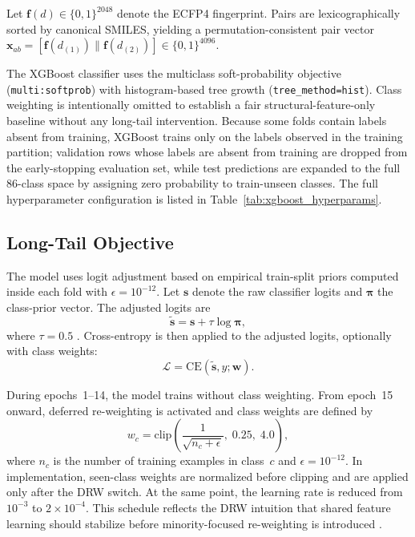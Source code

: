 \documentclass[11pt,a4paper,twocolumn]{article}
\begin{document}
Let $\mathbf{f}(d)\!\in\!\{0,1\}^{2048}$ denote the ECFP4 fingerprint.
Pairs are lexicographically sorted by canonical SMILES, yielding a
permutation-consistent pair vector
$\mathbf{x}_{ab} = [\mathbf{f}(d_{(1)}) \| \mathbf{f}(d_{(2)})]
\in \{0,1\}^{4096}$.

The XGBoost classifier uses the multiclass soft-probability objective
(\texttt{multi:softprob}) with histogram-based tree growth (\texttt{tree\_method=hist}).
Class weighting is intentionally omitted to establish a fair
structural-feature-only baseline without any long-tail intervention.
Because some folds contain labels absent from training, XGBoost trains only on
the labels observed in the training partition; validation rows whose labels are
absent from training are dropped from the early-stopping evaluation set, while
test predictions are expanded to the full 86-class space by assigning zero
probability to train-unseen classes.
The full hyperparameter configuration is listed in
Table~\ref{tab:xgboost_hyperparams}.

\subsection{Long-Tail Objective}
The model uses logit adjustment based on empirical train-split priors computed
inside each fold with $\epsilon = 10^{-12}$.
Let $\mathbf{s}$ denote the raw classifier logits and $\boldsymbol{\pi}$ the
class-prior vector.
The adjusted logits are
\begin{equation}
  \tilde{\mathbf{s}} = \mathbf{s} + \tau \log \boldsymbol{\pi},
\end{equation}
where $\tau = 0.5$ \cite{menon2021logit}.
Cross-entropy is then applied to the adjusted logits, optionally with class
weights:
\begin{equation}
  \mathcal{L} = \mathrm{CE}(\tilde{\mathbf{s}}, y; \mathbf{w}).
\end{equation}

During epochs~1--14, the model trains without class weighting.
From epoch~15 onward, deferred re-weighting is activated and class weights are
defined by
\begin{equation}
  w_c = \mathrm{clip}\!\left(\frac{1}{\sqrt{n_c + \epsilon}},\;
  0.25,\; 4.0\right),
\end{equation}
where $n_c$ is the number of training examples in class~$c$ and
$\epsilon = 10^{-12}$.
In implementation, seen-class weights are normalized before clipping and are
applied only after the DRW switch.
At the same point, the learning rate is reduced from $10^{-3}$ to
$2 \times 10^{-4}$.
This schedule reflects the DRW intuition that shared feature learning should
stabilize before minority-focused re-weighting is introduced \cite{cao2019ldam}.
\end{document}

